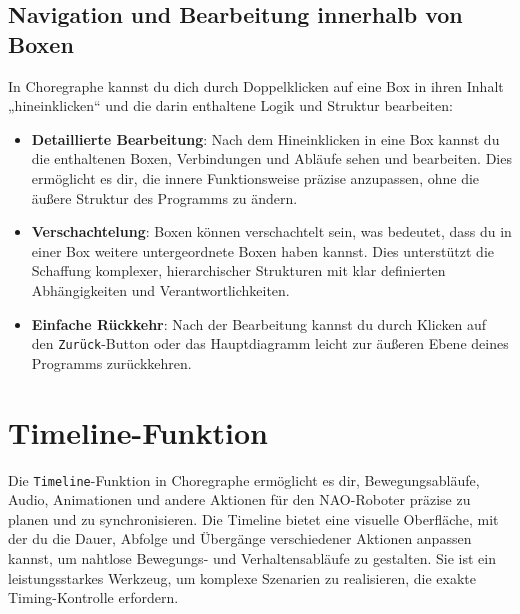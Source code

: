 \subsection{Navigation und Bearbeitung innerhalb von Boxen}
In Choregraphe kannst du dich durch Doppelklicken auf eine Box in ihren Inhalt „hineinklicken“ und die darin enthaltene Logik und Struktur bearbeiten:
\begin{itemize}
    \item \textbf{Detaillierte Bearbeitung}: Nach dem Hineinklicken in eine Box kannst du die enthaltenen Boxen, Verbindungen und Abläufe sehen und bearbeiten. Dies ermöglicht es dir, die innere Funktionsweise präzise anzupassen, ohne die äußere Struktur des Programms zu ändern.
    \item \textbf{Verschachtelung}: Boxen können verschachtelt sein, was bedeutet, dass du in einer Box weitere untergeordnete Boxen haben kannst. Dies unterstützt die Schaffung komplexer, hierarchischer Strukturen mit klar definierten Abhängigkeiten und Verantwortlichkeiten.
    \item \textbf{Einfache Rückkehr}: Nach der Bearbeitung kannst du durch Klicken auf den \texttt{Zurück}-Button oder das Hauptdiagramm leicht zur äußeren Ebene deines Programms zurückkehren.
\end{itemize}


\section{Timeline-Funktion}
Die \texttt{Timeline}-Funktion in Choregraphe ermöglicht es dir, Bewegungsabläufe, Audio, Animationen und andere Aktionen für den NAO-Roboter präzise zu planen und zu synchronisieren. Die Timeline bietet eine visuelle Oberfläche, mit der du die Dauer, Abfolge und Übergänge verschiedener Aktionen anpassen kannst, um nahtlose Bewegungs- und Verhaltensabläufe zu gestalten. Sie ist ein leistungsstarkes Werkzeug, um komplexe Szenarien zu realisieren, die exakte Timing-Kontrolle erfordern.

